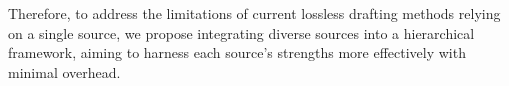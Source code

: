 Therefore, to address the limitations of current lossless drafting methods relying on a single source, we propose integrating diverse sources into a hierarchical framework, aiming to harness each source's strengths more effectively with minimal overhead.




